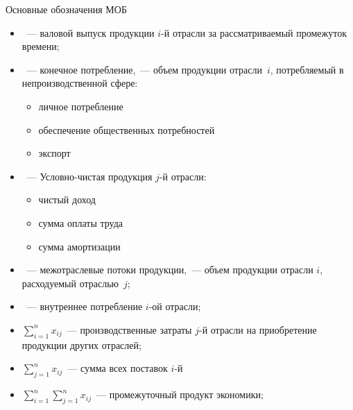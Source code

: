 \documentclass[unicode,11pt,notheorems,xcolor=table]{beamer}
\begin{document}
\begin{frame}[allowframebreaks]{Основные обозначения МОБ}
	\begin{itemize}
		\item {}~--- валовой выпуск продукции $i$-й отрасли за рассматриваемый промежуток времени;
		\item {}~---  конечное потребление,~--- объем продукции отрасли~$i$, потребляемый в непроизводственной сфере:
		\begin{itemize}
			\item личное потребление
			\item обеспечение общественных потребностей
			\item экспорт
		\end{itemize}
		\item {}~--- Условно-чистая продукция $j$-й отрасли:
		\begin{itemize}
			\item чистый доход
			\item сумма оплаты труда
			\item сумма амортизации
		\end{itemize}

		\framebreak		
		\item {}~--- межотраслевые потоки продукции,~--- объем продукции отрасли $i$, расходуемый отраслью~$j$;
		\item {}~--- внутреннее потребление $i$-ой отрасли;
		\item $\sum\limits_{i=1}^n x_{ij}$~--- производственные затраты $j$-й отрасли на приобретение продукции других отраслей;
		\item $\sum\limits_{j=1}^n x_{ij}$~--- сумма всех поставок $i$-й 		
		\item $\sum\limits_{i=1}^n\sum\limits_{j=1}^n x_{ij}$~--- промежуточный продукт экономики;
	\end{itemize}
\end{frame}
\end{document}
